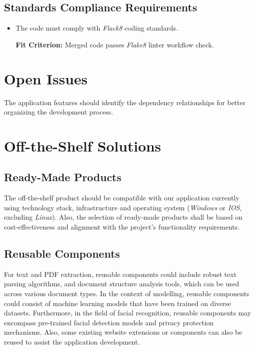 \documentclass[12pt]{article}
\newcounter{cprnum} %
\newcommand{\rthecprnum}{CPR\refstepcounter{cprnum}\thecprnum:}
\begin{document}
\subsection{Standards Compliance Requirements}
\begin{itemize}[leftmargin=16.5mm,labelsep=4mm,label=\rthecprnum]
\item The code must comply with \textit{Flack8} coding standards.

\textbf{Fit Criterion:} Merged code passes \textit{Flake8} linter workflow check.
\end{itemize}

\section{Open Issues}
 The application features should identify the dependency relationships for better organizing the development process.\\


\section{Off-the-Shelf Solutions}
\subsection{Ready-Made Products}

    The off-the-shelf product should be compatible with our application currently using technology stack, infrastructure and operating system (\textit{Windows} or \textit{IOS}, excluding \textit{Linux}).
    Also, the selection of ready-made products shall be based on cost-effectiveness and alignment with the project's functionality requirements.
    
\subsection{Reusable Components}
For text and PDF extraction, reusable components could include robust text parsing algorithms, and document structure analysis tools, which can be used across various document types. In the context of modelling, reusable components could consist of machine learning models that have been trained on diverse datasets. Furthermore, in the field of facial recognition, reusable components may encompass pre-trained facial detection models and privacy protection mechanisms. Also, some existing website extensions or components can also be reused to assist the application development. \\
\end{document}
